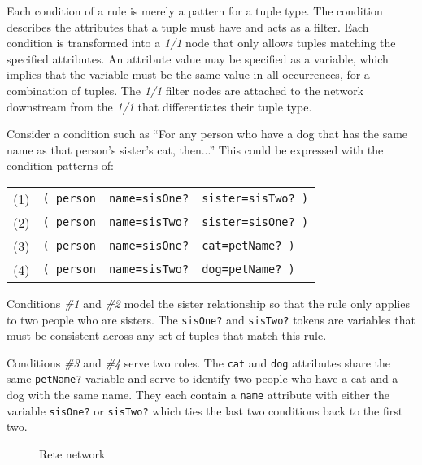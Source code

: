 Each condition of a rule is merely a pattern for a tuple type.
The condition describes the attributes that a tuple must have and acts
as a filter.  Each condition is transformed into a \emph{1/1} node
that only allows tuples matching the specified attributes.
An attribute value may be specified as a variable, which implies that
the variable must be the same value in all occurrences, for a 
combination of tuples.  The \emph{1/1} filter nodes are attached to
the network downstream from the \emph{1/1} that differentiates their
tuple type.

Consider a condition such as ``For any person who have a dog that
has the same name as that person's sister's cat, then...''  This could
be expressed with the condition patterns of:

\medskip

\begin{tabular}{llll}

(1) & \texttt{( person} & \texttt{name=sisOne?} & \texttt{sister=sisTwo? )}\\
(2) & \texttt{( person} & \texttt{name=sisTwo?} & \texttt{sister=sisOne? )}\\
(3) & \texttt{( person} & \texttt{name=sisOne?} & \texttt{cat=petName? )}\\
(4) & \texttt{( person} & \texttt{name=sisTwo?} & \texttt{dog=petName? )}\\

\end{tabular}

\medskip

Conditions \emph{\#1} and \emph{\#2} model the sister relationship so
that the rule only applies to two people who are sisters.  The
\verb|sisOne?| and \verb|sisTwo?| tokens are variables that must be
consistent across any set of tuples that match this rule.  

Conditions \emph{\#3} and \emph{\#4} serve two roles.  The \verb|cat|
and \verb|dog| attributes share the same \verb|petName?| variable and
serve to identify two people who have a cat and a dog with the same
name.  They each contain a \verb|name| attribute with either the
variable \verb|sisOne?| or \verb|sisTwo?| which ties the last two
conditions back to the first two.

\begin{figure}[htbpc]
  \begin{center}
  \end{center}
  \label{network.rete}
  \caption{Rete network}
\end{figure}

